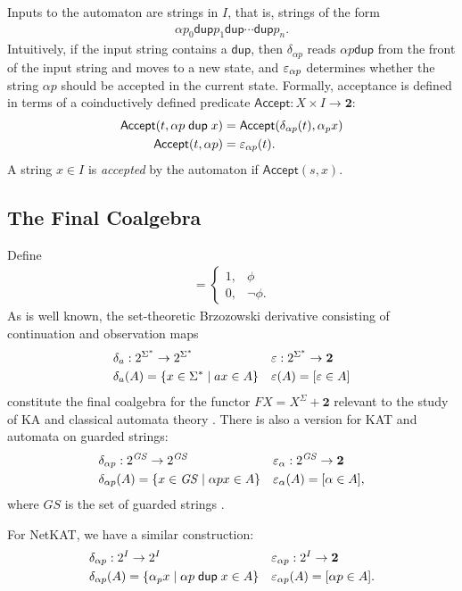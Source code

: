 \documentclass{article}
\newcommand\Two{\mathbf{2}}
\newcommand\bval[1]{[#1]}
\renewcommand\star{^*}
\renewcommand\powerset[1]{2^{#1}}
\newcommand\acc{\mathsf{Accept}}
\newcommand\GS{\mathit{GS}}
\newcommand{\netkat}{NetKAT\xspace}
\newcommand{\kw}[1]{\ensuremath{\mathsf{#1}}}
\newcommand{\pdup}{\ensuremath{\mathrel{\kw{dup}}}}
\begin{document}
Inputs to the automaton are strings in $I$, that is, strings of the form
\begin{align*}
\alpha p_0\pdup p_1\pdup\cdots\pdup p_n.
\end{align*}
Intuitively, if the input string contains a $\pdup$, then $\delta_{\alpha p}$ reads $\alpha p\pdup$ from the front of the input string and moves to a new state, and $\varepsilon_{\alpha p}$ determines whether the string $\alpha p$ should be accepted in the current state. Formally, acceptance is defined in terms of a coinductively defined predicate $\acc:X\times I\to\Two$:
\begin{align*}
\acc(t,\alpha p\pdup x) &= \acc(\delta_{\alpha p}(t),\alpha_p x)\\
\acc(t,\alpha p) &= \eps_{\alpha p}(t).
\end{align*}
A string $x\in I$ is \emph{accepted} by the automaton if $\acc(s,x)$.

\subsection{The Final Coalgebra}

Define
\begin{gather*}
\bval\phi = \begin{cases}
1, & \phi\\
0, & \neg\phi.
\end{cases}
\end{gather*}
As is well known, the set-theoretic Brzozowski derivative consisting of continuation and observation maps
\begin{align*}
& \delta_a:\powerset{\Sigma\star}\to\powerset{\Sigma\star} && \eps:\powerset{\Sigma\star}\to\Two\\
& \delta_a(A) = \set{x\in\Sigma\star}{ax\in A} && \eps(A) = \bval{\eps\in A}
\end{align*}
constitute the final coalgebra for the functor $FX = X^\Sigma + \Two$ relevant to the study of KA and classical automata theory \cite{Rutten00,Silva10}. There is also a version for KAT and automata on guarded strings:
\begin{align*}
& \delta_{\alpha p}:\powerset\GS\to\powerset\GS && \eps_\alpha:\powerset\GS\to\Two\\
& \delta_{\alpha p}(A) = \set{x\in\GS}{\alpha px\in A} && \eps_\alpha(A) = \bval{\alpha\in A},
\end{align*}
where $\GS$ is the set of guarded strings \cite{K08a}.

For \netkat, we have a similar construction:
\begin{align*}
& \delta_{\alpha p} : \powerset I \fun \powerset I && \eps_{\alpha p} : \powerset I \fun \Two\\
& \delta_{\alpha p}(A) = \set{\alpha_p x}{\alpha p\pdup x\in A} && \eps_{\alpha p}(A) = \bval{\alpha p\in A}.
\end{align*}
\end{document}

